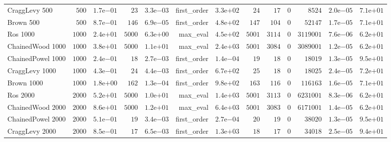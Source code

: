 \begin{longtable}[c]{lrrrrrrrrrrrr}
CraggLevy 500 & \(  500\) & \( 1.7\)e\(-01\) & \(   23\) & \( 3.3\)e\(-03\) & first\_order & \( 3.3\)e\(+02\) & \(   24\) & \(   17\) & \(    0\) & \( 8524\) & \( 2.0\)e\(-05\) & \( 7.1\)e\(+01\) \\
Brown 500 & \(  500\) & \( 8.7\)e\(-01\) & \(  146\) & \( 6.9\)e\(-05\) & first\_order & \( 4.8\)e\(+02\) & \(  147\) & \(  104\) & \(    0\) & \(52147\) & \( 1.7\)e\(-05\) & \( 7.1\)e\(+01\) \\
Ros 1000 & \( 1000\) & \( 2.4\)e\(+01\) & \( 5000\) & \( 6.3\)e\(+00\) & max\_eval & \( 4.5\)e\(+02\) & \( 5001\) & \( 3114\) & \(    0\) & \(3119001\) & \( 7.6\)e\(-06\) & \( 6.2\)e\(+01\) \\
ChainedWood 1000 & \( 1000\) & \( 3.8\)e\(+01\) & \( 5000\) & \( 1.1\)e\(+01\) & max\_eval & \( 2.4\)e\(+03\) & \( 5001\) & \( 3084\) & \(    0\) & \(3089001\) & \( 1.2\)e\(-05\) & \( 6.2\)e\(+01\) \\
ChainedPowel 1000 & \( 1000\) & \( 2.4\)e\(-01\) & \(   18\) & \( 2.7\)e\(-03\) & first\_order & \( 1.4\)e\(-04\) & \(   19\) & \(   18\) & \(    0\) & \(18019\) & \( 1.3\)e\(-05\) & \( 9.5\)e\(+01\) \\
CraggLevy 1000 & \( 1000\) & \( 4.3\)e\(-01\) & \(   24\) & \( 4.4\)e\(-03\) & first\_order & \( 6.7\)e\(+02\) & \(   25\) & \(   18\) & \(    0\) & \(18025\) & \( 2.4\)e\(-05\) & \( 7.2\)e\(+01\) \\
Brown 1000 & \( 1000\) & \( 1.8\)e\(+00\) & \(  162\) & \( 1.3\)e\(-04\) & first\_order & \( 9.8\)e\(+02\) & \(  163\) & \(  116\) & \(    0\) & \(116163\) & \( 1.6\)e\(-05\) & \( 7.1\)e\(+01\) \\
Ros 2000 & \( 2000\) & \( 5.2\)e\(+01\) & \( 5000\) & \( 1.0\)e\(+01\) & max\_eval & \( 1.4\)e\(+03\) & \( 5001\) & \( 3113\) & \(    0\) & \(6231001\) & \( 8.3\)e\(-06\) & \( 6.2\)e\(+01\) \\
ChainedWood 2000 & \( 2000\) & \( 8.6\)e\(+01\) & \( 5000\) & \( 1.2\)e\(+01\) & max\_eval & \( 6.4\)e\(+03\) & \( 5001\) & \( 3083\) & \(    0\) & \(6171001\) & \( 1.4\)e\(-05\) & \( 6.2\)e\(+01\) \\
ChainedPowel 2000 & \( 2000\) & \( 5.1\)e\(-01\) & \(   19\) & \( 3.4\)e\(-03\) & first\_order & \( 2.7\)e\(-04\) & \(   20\) & \(   19\) & \(    0\) & \(38020\) & \( 1.3\)e\(-05\) & \( 9.5\)e\(+01\) \\
CraggLevy 2000 & \( 2000\) & \( 8.5\)e\(-01\) & \(   17\) & \( 6.5\)e\(-03\) & first\_order & \( 1.3\)e\(+03\) & \(   18\) & \(   17\) & \(    0\) & \(34018\) & \( 2.5\)e\(-05\) & \( 9.4\)e\(+01\) \\

\end{longtable}

